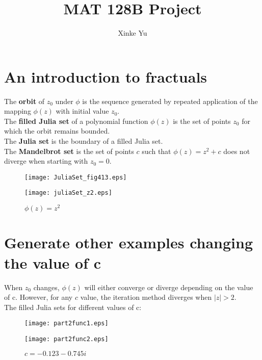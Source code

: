 \documentclass[11pt]{article}
\title{MAT 128B  Project}
\author{Xinke Yu}
\date{}							%
\begin{document}
\maketitle

\section{An introduction to fractuals}
The \textbf{orbit}  of $z_0$ under $\phi$ is the sequence generated by repeated application of the mapping $\phi (z)$ with initial value $z_0$.\\
The \textbf{filled Julia set} of a polynomial function $\phi(z)$ is the set of points $z_0$ for which the orbit remains bounded.\\
The \textbf{Julia set} is the boundary of a filled Julia set.\\
The \textbf{Mandelbrot set} is the set of points $c$ such that $\phi(z) = z^2 + c$ does not diverge when starting with $z_0 = 0$.\\
\begin{figure}[!hbp]
  \centering
  \begin{minipage}[b]{0.45\textwidth}
    \texttt{[image: JuliaSet\_fig413.eps]}
    \caption{$\phi(z)=z^2-1.25$}
  \end{minipage}
  \hfill
  \begin{minipage}[b]{0.45\textwidth}
    \texttt{[image: juliaSet\_z2.eps]}
    \caption{$\phi(z)=z^2$}
  \end{minipage}
\end{figure}


\section{Generate other examples changing the value of c}
When $z_0$ changes, $\phi(z)$ will either converge or diverge depending on the value of c. However, for any $c$ value, the iteration method diverges when $|z|> 2$.\\
The filled Julia sets for different values of c:\\
\begin{figure}[H]
  \centering
  \begin{minipage}[b]{0.45\textwidth}
    \texttt{[image: part2func1.eps]}
    \caption{$c = 0.36 + 0.1i$}
  \end{minipage}
  \hfill
  \begin{minipage}[b]{0.45\textwidth}
    \texttt{[image: part2func2.eps]}
    \caption{$c = -0.123 - 0.745i$}
  \end{minipage}
   \end{figure}
   
\end{document}
